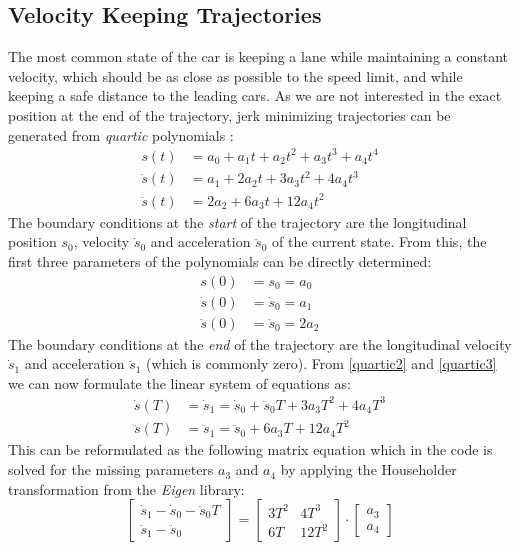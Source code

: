 \documentclass[twoside]{article}
\begin{document}
\subsection{Velocity Keeping Trajectories}
The most common state of the car is keeping a lane while maintaining a constant velocity, which
should be as close as possible to the speed limit, and while keeping a safe distance to the leading
cars. As we are not interested in the exact position at the end of the trajectory, jerk minimizing
trajectories can be generated from \emph{quartic} polynomials \cite{werling2010optimal}:
\begin{align}
s(t) &= a_0 + a_1 t + a_2 t^2 + a_3 t^3 + a_4 t^4\\
\dot{s}(t) &= a_1 + 2 a_2 t + 3 a_3 t^2 + 4 a_4 t^3 \label{quartic2}\\
\ddot{s}(t) &= 2 a_2 + 6 a_3 t + 12 a_4 t^2 \label{quartic3}
\end{align}
The boundary conditions at the \emph{start} of the trajectory are the longitudinal position $s_0$,
velocity $\dot s_0$ and acceleration $\ddot s_0$ of the current state.
From this, the first three parameters of the polynomials can be directly determined:
\begin{align}
s(0) &= s_0 = a_0\\
\dot s(0) &= \dot s_0 = a_1\\
\ddot s(0) &= \ddot s_0 = 2 a_2
\end{align}
The boundary conditions at the \emph{end} of the trajectory are the longitudinal velocity $\dot s_1$
and acceleration $\ddot s_1$ (which is commonly zero). From \eqref{quartic2} and \eqref{quartic3}
we can now formulate the linear system of equations as:
\begin{align}
\dot s(T) &= \dot s_1 = \dot s_0 + \ddot s_0 T + 3 a_3 T^2 + 4 a_4 T^3\\
\ddot s(T) &= \ddot s_1 = \ddot s_0 + 6 a_3 T + 12 a_4 T^2
\end{align}
This can be reformulated as the following matrix equation which in the code is solved for the
missing parameters $a_3$ and $a_4$ by applying the Householder transformation from the \emph{Eigen}
library:
\begin{equation}
  \begin{bmatrix}
    \dot s_1 - \dot s_0 - \ddot s_0 T \\
    \ddot s_1 - \ddot s_0
  \end{bmatrix}
=
\begin{bmatrix}
3 T^2 & 4 T^3 \\
6 T & 12 T^2
\end{bmatrix}
\cdot
\begin{bmatrix}
  a_3 \\ a_4
\end{bmatrix}
\label{quartic_matrix}
\end{equation}
\end{document}
